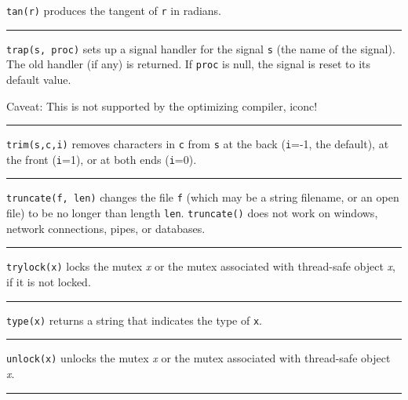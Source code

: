 \noindent
{}\texttt{tan(r)} produces the tangent of \texttt{r} in
radians.

\bigskip\hrule\vspace{0.1cm}

\noindent
{}\texttt{trap(s, proc)} sets up a signal handler for
the signal \texttt{s} (the name of the signal). The old handler (if
any) is returned. If \texttt{proc} is null, the signal is reset to its
default value. 

Caveat: This is not supported by the optimizing
compiler, iconc!

\bigskip\hrule\vspace{0.1cm}

\noindent
{}\texttt{trim(s,c,i)} removes characters in \texttt{c}
from \texttt{s} at the back (\texttt{i}=-1, the default), at the front
(\texttt{i}=1), or at both ends (\texttt{i}=0).

\bigskip\hrule\vspace{0.1cm}

\noindent
{}\texttt{truncate(f, len)} changes the file
\texttt{f} (which may be a string filename, or an open file) to be no
longer than length \texttt{len}. \texttt{truncate()} does not work on
windows, network connections, pipes, or databases.

\bigskip\hrule\vspace{0.1cm}

\noindent
{}\texttt{trylock(x)} locks the mutex {\textit x} or the mutex
associated with thread-safe object {\textit x}, if it is not locked.

\bigskip\hrule\vspace{0.1cm}

\noindent
{}\texttt{type(x)} returns a string that indicates the type
of \texttt{x}.

\bigskip\hrule\vspace{0.1cm}

\noindent
{}\texttt{unlock(x)} unlocks the mutex {\textit x} or the mutex
associated with thread-safe object {\textit x}.

\bigskip\hrule\vspace{0.1cm}

